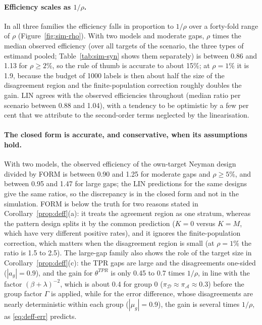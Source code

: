 \documentclass[pdflatex,sn-mathphys-num,iicol]{sn-jnl}
\theoremstyle{thmstyleone}
\theoremstyle{thmstyletwo}
\theoremstyle{thmstylethree}
\begin{document}
\paragraph{Efficiency scales as $1/\rho$.} In all three families the efficiency falls in proportion
to $1/\rho$ over a forty-fold range of $\rho$ (Figure~\ref{fig:sim-rho}). With two models and
moderate gaps, $\rho$ times the median observed efficiency (over all targets of the scenario, the three types of estimand pooled; Table~\ref{tab:sim-syn} shows them separately) is between 0.86 and 1.13 for
$\rho\ge2\%$, so the rule of thumb is accurate to about 15\%; at $\rho=1\%$ it is 1.9, because the
budget of 1000 labels is then about half the size of the disagreement region and the
finite-population correction roughly doubles the gain. LIN agrees with the observed efficiencies
throughout (median ratio per scenario between 0.88 and 1.04), with a tendency to be optimistic by a
few per cent that we attribute to the second-order terms neglected by the linearisation.

\paragraph{The closed form is accurate, and conservative, when its assumptions hold.} With two
models, the observed efficiency of the own-target Neyman design divided by FORM is between 0.90 and
1.25 for moderate gaps and $\rho\ge5\%$, and between 0.95 and 1.47 for large gaps; the LIN
predictions for the same designs give the same ratios, so the discrepancy is in the closed form and
not in the simulation. FORM is below the truth for two reasons stated in
Corollary~\ref{prop:deff}(a): it treats the agreement region as one stratum, whereas the pattern
design splits it by the common prediction ($K=0$ versus $K=M$, which have very different positive
rates), and it ignores the finite-population correction, which matters when the disagreement region
is small (at $\rho=1\%$ the ratio is 1.5 to 2.5). The large-gap family also shows the role of the
target size in Corollary~\ref{prop:deff}(c): the TPR gaps are large and the disagreements one-sided
($|a_g|=0.9$), and the gain for $\theta^{TPR}$ is only 0.45 to 0.7 times $1/\rho$, in line with
the factor $(\beta+\lambda)^{-2}$, which is about 0.4 for group 0 ($\pi_{\mathcal D}\approx
\pi_{\mathcal A}\approx0.3$) before the group factor $\Gamma$ is applied, while for the error difference, whose disagreements are nearly
deterministic within each group ($|\mu_g|=0.9$), the gain is several times $1/\rho$, as
\eqref{eq:deff-err} predicts.
\end{document}
